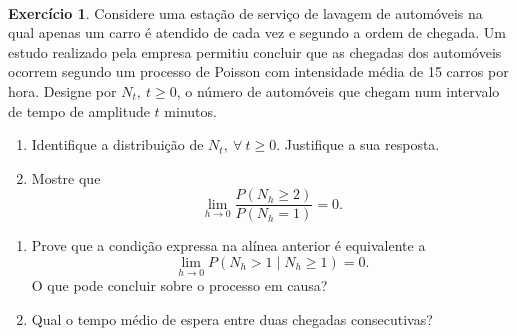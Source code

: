 \documentclass[
  11pt,
  a4paper,
]{book}
\theoremstyle{definition}
\theoremstyle{definition}
\theoremstyle{definition}
\newtheorem{exercise}{Exercício}[chapter]
\theoremstyle{definition}
\theoremstyle{remark}
\begin{document}
\(\,\)

\begin{exercise}
\leavevmode

Considere uma estação de serviço de lavagem de automóveis na qual apenas um carro é atendido de cada vez e segundo a ordem de chegada. Um estudo realizado pela empresa permitiu concluir que as chegadas dos automóveis ocorrem segundo um processo de Poisson com intensidade média de 15 carros por hora. Designe por \(N_t,~t \geq 0\), o número de automóveis que chegam num intervalo de tempo de amplitude \(t\) minutos.

\begin{enumerate}
\def\labelenumi{(\alph{enumi})}
\item
  Identifique a distribuição de \(N_t, ~ \forall ~t \geq 0\). Justifique a sua resposta.
\item
  Mostre que
  \[\lim\limits_{h \to 0} \dfrac{P(N_h \geq 2)}{P(N_h =1)}=0.\]
\end{enumerate}

\begin{enumerate}
\def\labelenumi{\alph{enumi})}
\setcounter{enumi}{2}
\item
  Prove que a condição expressa na alínea anterior é equivalente a
  \[\lim\limits_{h \to 0} P(N_h >1 \mid N_h \geq 1 )=0.\]
  O que pode concluir sobre o processo em causa?
\item
  Qual o tempo médio de espera entre duas chegadas consecutivas?
\end{enumerate}

\end{exercise}

\(\,\)
\end{document}
